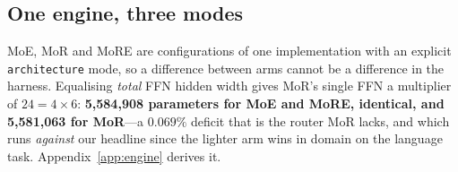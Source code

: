 \subsection{One engine, three modes}\label{sec:engine} MoE, MoR and MoRE are configurations of one implementation with an explicit \texttt{architecture} mode, so a difference between arms cannot be a difference in the harness. Equalising \emph{total} FFN hidden width gives MoR's single FFN a multiplier of $24=4\times6$: \textbf{5{,}584{,}908 parameters for MoE and MoRE, identical, and 5{,}581{,}063 for MoR}---a $0.069\%$ deficit that is the router MoR lacks, and which runs \emph{against} our headline since the lighter arm wins in domain on the language task. Appendix~\ref{app:engine} derives it.
